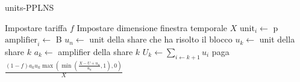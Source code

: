 \begin{algorithm}
  \caption{units-PPLNS}
  \label{alg_unit_pplns}
  \begin{algorithmic}
    \STATE Impostare tariffa $f$
    \STATE Impostare dimensione finestra temporale $X$ 
      \REPEAT
          \STATE $\text{unit}_i \leftarrow$ p
          \STATE $\text{amplifier}_i \leftarrow$ B
        \ENDIF
      \STATE $u_n \leftarrow$ unit della share che ha risolto il blocco
        \STATE $u_k \leftarrow$ unit della share $k$
        \STATE $a_k \leftarrow$ amplifier della share $k$
        \STATE $U_k \leftarrow \sum_{i \leftarrow k+1} u_i$
        \STATE paga $\frac{\left(1-f\right) a_k u_k \max \left(\min \left(\frac{X - U + u_n}{u_n}, 1\right),0\right)}{X}$
      \ENDFOR
    \ENDFOR
  \end{algorithmic}
\end{algorithm}
